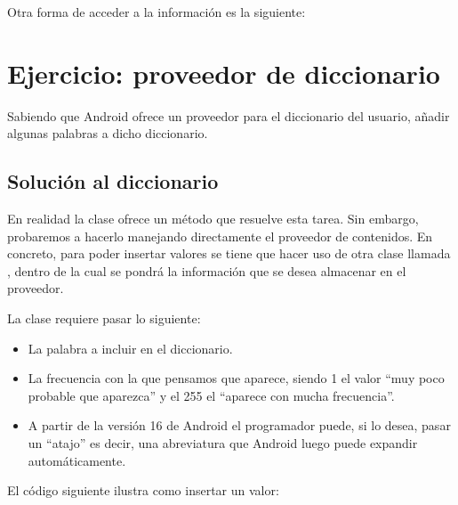 \documentclass[a4paper,12pt,spanish]{sphinxmanual}
\begin{document}
Otra forma de acceder a la información es la siguiente:


\section{Ejercicio: proveedor de diccionario}
\label{tema2:ejercicio-proveedor-de-diccionario}
Sabiendo que Android ofrece un proveedor para el diccionario del usuario, añadir algunas palabras a dicho diccionario.


\subsection{Solución al diccionario}
\label{tema2:solucion-al-diccionario}
En realidad la clase  ofrece un método  que resuelve esta tarea. Sin embargo, probaremos a hacerlo manejando directamente el proveedor de contenidos. En concreto, para poder insertar valores se tiene que hacer uso de otra clase llamada , dentro de la cual se pondrá la información que se desea almacenar en el proveedor.

La clase  requiere pasar lo siguiente:
\begin{itemize}
\item {} 
La palabra a incluir en el diccionario.

\item {} 
La frecuencia con la que pensamos que aparece, siendo 1 el valor ``muy poco probable que aparezca'' y el 255 el ``aparece con mucha frecuencia''.

\item {} 
A partir de la versión 16 de Android el programador puede, si lo desea, pasar un ``atajo'' es decir, una abreviatura que Android luego puede expandir automáticamente.

\end{itemize}

El código siguiente ilustra como insertar un valor:
\end{document}
